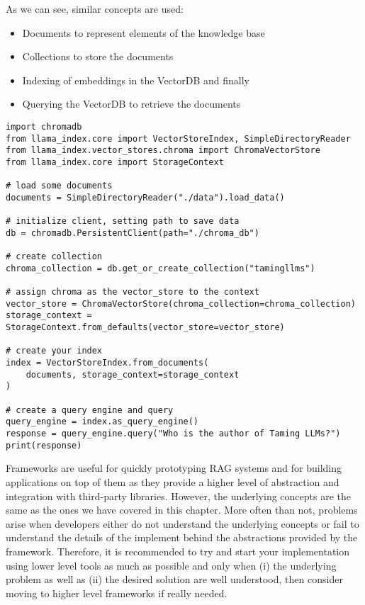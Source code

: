 As we can see, similar concepts are used:
\begin{itemize}
\item Documents to represent elements of the knowledge base
\item Collections to store the documents
\item Indexing of embeddings in the VectorDB and finally
\item Querying the VectorDB to retrieve the documents
\end{itemize}

\begin{verbatim}
import chromadb
from llama_index.core import VectorStoreIndex, SimpleDirectoryReader
from llama_index.vector_stores.chroma import ChromaVectorStore
from llama_index.core import StorageContext

# load some documents
documents = SimpleDirectoryReader("./data").load_data()

# initialize client, setting path to save data
db = chromadb.PersistentClient(path="./chroma_db")

# create collection
chroma_collection = db.get_or_create_collection("tamingllms")

# assign chroma as the vector_store to the context
vector_store = ChromaVectorStore(chroma_collection=chroma_collection)
storage_context = StorageContext.from_defaults(vector_store=vector_store)

# create your index
index = VectorStoreIndex.from_documents(
    documents, storage_context=storage_context
)

# create a query engine and query
query_engine = index.as_query_engine()
response = query_engine.query("Who is the author of Taming LLMs?")
print(response)
\end{verbatim}
Frameworks are useful for quickly prototyping RAG systems and for building applications on top of them as they provide a higher level of abstraction and integration with third-party libraries. However, the underlying concepts are the same as the ones we have covered in this chapter. More often than not, problems arise when developers either do not understand the underlying concepts or fail to understand the details of the implement behind the abstractions provided by the framework. Therefore, it is recommended to try and start your implementation using lower level tools as much as possible and only when (i) the underlying problem as well as (ii) the desired solution are well understood, then consider moving to higher level frameworks if really needed.

